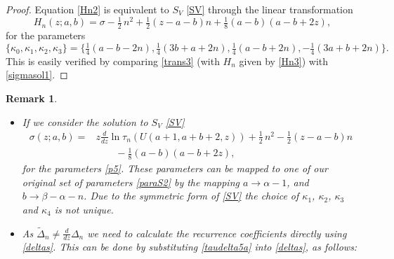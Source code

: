 \documentclass[12pt]{article}
\newtheorem{mydef3}{Remark}[section]
\numberwithin{figure}{section}
\numberwithin{equation}{section}
\numberwithin{table}{section}
\begin{document}
\begin{proof}
Equation \eqref{Hn2} is equivalent to $S_V$ \eqref{SV} through the linear transformation
\begin{equation}
H_n(z; a, b)=\sigma-\tfrac{1}{2}\,{n}^{2}+\tfrac{1}{2}\left( z-a-b \right) n+ \tfrac{1}{8}\left(  a- b \right)( a- b+2z),\label{trans3}
\end{equation}
for the parameters
\begin{equation}
\{\kappa_0,\kappa_1,\kappa_2,\kappa_3\}=\{\tfrac{1}{4}( a- b-2n),\tfrac{1}{4}(3 b+ a+2n),\tfrac{1}{4}( a- b+2n),-\tfrac{1}{4}(3 a+ b+2n)\}.\label{p5}
\end{equation}
This is easily verified by comparing \eqref{trans3} (with $H_n$ given by \eqref{Hn3}) with \eqref{sigmasol1}.
\end{proof}
\begin{mydef3}
{\quad \phantom{x}
\begin{itemize}
\item
If we consider the solution to $S_V$ \eqref{SV}
\begin{align*}
\sigma(z; a, b)=&z\frac{d}{dz}\ln\tau_n(U({ a+1,a+b+2,z}))+\tfrac{1}{2}\,{n}^{2}-\tfrac{1}{2}\left( z-a-b \right) n\\
&\qquad- \tfrac{1}{8}\left(  a- b \right)( a- b+2z),
\end{align*}
for the parameters \eqref{p5}. These parameters can be mapped to one of our original set of parameters \eqref{paraS2} by the mapping
$ a\rightarrow \alpha-1$, and $ b\rightarrow \beta- \alpha-n$. Due to the symmetric form of \eqref{SV} the choice of $\kappa_1$, $\kappa_2$, $\kappa_3$ and $\kappa_4$ is not unique.
\item
As $\widetilde\Delta_n\ne\frac{d}{dz}\Delta_n$ we need to calculate the recurrence coefficients directly using \eqref{deltas}. This can be done by substituting \eqref{taudelta5a} into \eqref{deltas}, as follows:


\end{itemize}}
\end{mydef3}
\end{document}
